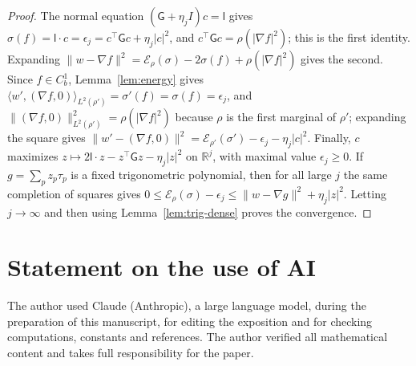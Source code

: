 \documentclass[11pt]{amsart}
\numberwithin{equation}{section}
\theoremstyle{plain}
\theoremstyle{remark}
\newcommand{\R}{\mathbb{R}}
\newcommand{\cE}{\mathcal{E}}
\newcommand{\la}{\langle}
\newcommand{\ra}{\rangle}
\begin{document}
\begin{proof}
The normal equation $(\mathsf G+\eta_jI)c=\mathsf l$ gives $\sigma(f)=\mathsf l\cdot c=\epsilon_j=c^{\top}\mathsf Gc+\eta_j|c|^2$, and $c^{\top}\mathsf Gc=\rho(|\nabla f|^2)$; this is the first identity. Expanding $\|w-\nabla f\|^2=\cE_\rho(\sigma)-2\sigma(f)+\rho(|\nabla f|^2)$ gives the second. Since $f\in C^1_b$, Lemma~\ref{lem:energy} gives $\la w',(\nabla f,0)\ra_{L^2(\rho')}=\sigma'(f)=\sigma(f)=\epsilon_j$, and $\|(\nabla f,0)\|^2_{L^2(\rho')}=\rho(|\nabla f|^2)$ because $\rho$ is the first marginal of $\rho'$; expanding the square gives $\|w'-(\nabla f,0)\|^2=\cE_{\rho'}(\sigma')-\epsilon_j-\eta_j|c|^2$. Finally, $c$ maximizes $z\mapsto2\mathsf l\cdot z-z^{\top}\mathsf Gz-\eta_j|z|^2$ on $\R^j$, with maximal value $\epsilon_j\ge0$. If $g=\sum_pz_p\tau_p$ is a fixed trigonometric polynomial, then for all large $j$ the same completion of squares gives $0\le\cE_\rho(\sigma)-\epsilon_j\le\|w-\nabla g\|^2+\eta_j|z|^2$. Letting $j\to\infty$ and then using Lemma~\ref{lem:trig-dense} proves the convergence.
\end{proof}

\section*{Statement on the use of AI}
The author used Claude (Anthropic), a large language model, during the preparation of this manuscript, for editing the exposition and for checking computations, constants and references. The author verified all mathematical content and takes full responsibility for the paper.
\end{document}
